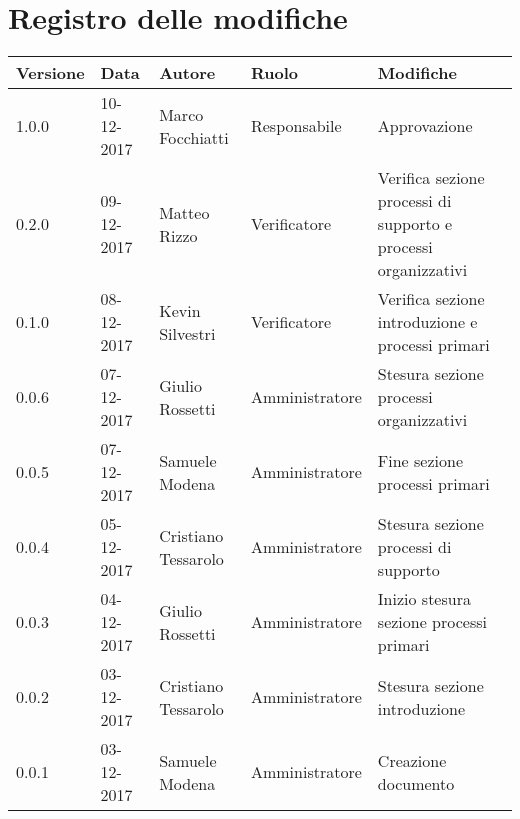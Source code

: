 \documentclass[./NormediProgetto.tex]{subfiles}
\begin{document}
\chapter*{Registro delle modifiche}
\begin{center}	
\begin{tabular}{|l|l|l|l|p{4cm}|}
		\hline
		\textbf{Versione} & \textbf{Data} & \textbf{Autore} & \textbf{Ruolo} & \textbf{Modifiche} \\ \hline
		1.0.0 & 10-12-2017 & Marco Focchiatti & Responsabile & Approvazione\\ \hline
		0.2.0 & 09-12-2017 & Matteo Rizzo & Verificatore & Verifica sezione processi di supporto e processi organizzativi\\ \hline
		0.1.0 & 08-12-2017 & Kevin Silvestri & Verificatore & Verifica sezione introduzione e processi primari\\ \hline
		0.0.6 & 07-12-2017 & Giulio Rossetti & Amministratore & Stesura sezione processi organizzativi\\ \hline
		0.0.5 & 07-12-2017 & Samuele Modena & Amministratore & Fine sezione processi primari\\ \hline
		0.0.4 & 05-12-2017 & Cristiano Tessarolo & Amministratore & Stesura sezione processi di supporto\\ \hline
		0.0.3 & 04-12-2017 & Giulio Rossetti & Amministratore & Inizio stesura sezione processi primari\\ \hline
		0.0.2 & 03-12-2017 & Cristiano Tessarolo & Amministratore & Stesura sezione introduzione\\ \hline
		0.0.1 & 03-12-2017 & Samuele Modena & Amministratore & Creazione documento\\ \hline
		
\end{tabular}
\end{center}
\end{document}
